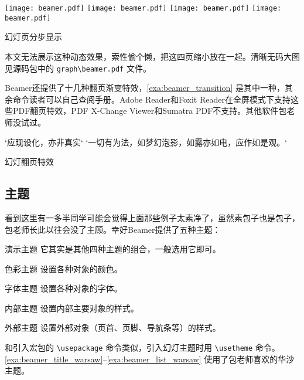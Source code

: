 \begin{example}[h]
\begin{Demo}
\centering
\texttt{[image: beamer.pdf]}
\texttt{[image: beamer.pdf]}
\texttt{[image: beamer.pdf]}
\texttt{[image: beamer.pdf]}
\end{Demo}
\caption{幻灯页分步显示}
\label{exa:beamer_pause}
\end{example}

本文无法展示这种动态效果，索性偷个懒，把这四页缩小放在一起。清晰无码大图见源码包中的 \verb|graph\beamer.pdf| 文件。

Beamer还提供了十几种翻页渐变特效，\autoref{exa:beamer_transition} 是其中一种，其余命令读者可以自己查阅手册\citep{Tantau_2012}。Adobe Reader和Foxit Reader在全屏模式下支持这些PDF翻页特效，PDF X-Change Viewer和Sumatra PDF不支持。其他软件包老师没试过。

\begin{example}[h]
\begin{Code}[]
\begin{frame}{`应现设化，亦非真实`}
\transdissolve
`一切有为法，如梦幻泡影，如露亦如电，应作如是观。`
\end{frame}
\end{Code}
\caption{幻灯翻页特效}
\label{exa:beamer_transition}
\end{example}

\subsection{主题} 

看到这里有一多半同学可能会觉得上面那些例子太素净了，虽然素包子也是包子，包老师长此以往会没了主顾。幸好Beamer提供了五种主题：

\begin{compactdesc}
    \item [演示主题] 它其实是其他四种主题的组合，一般选用它即可。
    \item [色彩主题] 设置各种对象的颜色。
    \item [字体主题] 设置各种对象的字体。
    \item [内部主题] 设置内部主要对象的样式。
    \item [外部主题] 设置外部对象（页首、页脚、导航条等）的样式。
\end{compactdesc}
 
和引入宏包的 \verb|\usepackage| 命令类似，引入幻灯主题时用 \verb|\usetheme| 命令。\autoref{exa:beamer_title_warsaw}--\autoref{exa:beamer_list_warsaw} 使用了包老师喜欢的华沙主题。

